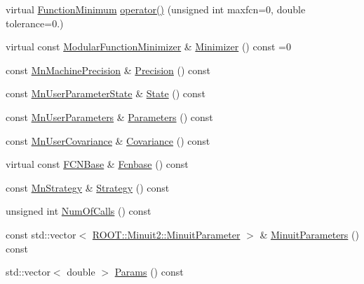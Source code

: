 \begin{DoxyCompactItemize}
\item 
virtual \mbox{\hyperlink{classROOT_1_1Minuit2_1_1FunctionMinimum}{Function\+Minimum}} \mbox{\hyperlink{classROOT_1_1Minuit2_1_1MnApplication_a67d746cf939174c8da6552636a11154a}{operator()}} (unsigned int maxfcn=0, double tolerance=0.)
\item 
virtual const \mbox{\hyperlink{classROOT_1_1Minuit2_1_1ModularFunctionMinimizer}{Modular\+Function\+Minimizer}} \& \mbox{\hyperlink{classROOT_1_1Minuit2_1_1MnApplication_a5a8e1e2658b731b5f4023dd1b1594223}{Minimizer}} () const =0
\item 
const \mbox{\hyperlink{classROOT_1_1Minuit2_1_1MnMachinePrecision}{Mn\+Machine\+Precision}} \& \mbox{\hyperlink{classROOT_1_1Minuit2_1_1MnApplication_a8de6eb3be52721cec183ba830504e7bc}{Precision}} () const
\item 
const \mbox{\hyperlink{classROOT_1_1Minuit2_1_1MnUserParameterState}{Mn\+User\+Parameter\+State}} \& \mbox{\hyperlink{classROOT_1_1Minuit2_1_1MnApplication_ac82c0ac40ced7cf8904dc702a79512f7}{State}} () const
\item 
const \mbox{\hyperlink{classROOT_1_1Minuit2_1_1MnUserParameters}{Mn\+User\+Parameters}} \& \mbox{\hyperlink{classROOT_1_1Minuit2_1_1MnApplication_a8a6af4bd7d2f8af8524bca7a67b2f62d}{Parameters}} () const
\item 
const \mbox{\hyperlink{classROOT_1_1Minuit2_1_1MnUserCovariance}{Mn\+User\+Covariance}} \& \mbox{\hyperlink{classROOT_1_1Minuit2_1_1MnApplication_abd83494a6b9b808683edc162c28a9888}{Covariance}} () const
\item 
virtual const \mbox{\hyperlink{classROOT_1_1Minuit2_1_1FCNBase}{F\+C\+N\+Base}} \& \mbox{\hyperlink{classROOT_1_1Minuit2_1_1MnApplication_af4eb3fe4927d3a8e0efcd5c6b7100881}{Fcnbase}} () const
\item 
const \mbox{\hyperlink{classROOT_1_1Minuit2_1_1MnStrategy}{Mn\+Strategy}} \& \mbox{\hyperlink{classROOT_1_1Minuit2_1_1MnApplication_ad4eba6a0369cc3fa9ce9b676582a77a7}{Strategy}} () const
\item 
unsigned int \mbox{\hyperlink{classROOT_1_1Minuit2_1_1MnApplication_a089843f663ccb31fcca2e58016ec7e9d}{Num\+Of\+Calls}} () const
\item 
const std\+::vector$<$ \mbox{\hyperlink{classROOT_1_1Minuit2_1_1MinuitParameter}{R\+O\+O\+T\+::\+Minuit2\+::\+Minuit\+Parameter}} $>$ \& \mbox{\hyperlink{classROOT_1_1Minuit2_1_1MnApplication_a8ae2de0bd82d99a3ac28da32bcbe98ea}{Minuit\+Parameters}} () const
\item 
std\+::vector$<$ double $>$ \mbox{\hyperlink{classROOT_1_1Minuit2_1_1MnApplication_ae821bfc8bb4659bd3b01835c1d58387c}{Params}} () const

\end{DoxyCompactItemize}

